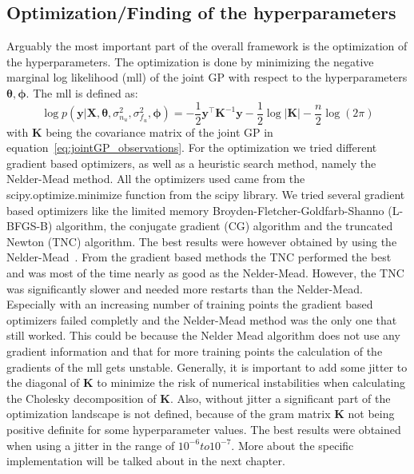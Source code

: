 \documentclass{article}
\begin{document}
\subsection{Optimization/Finding of the hyperparameters}
Arguably the most important part of the overall framework is the optimization of the hyperparameters. The optimization is done by minimizing the negative marginal log likelihood (mll) of the joint GP with respect to the hyperparameters $\bm{\theta, \phi}$. The mll is defined as:
\begin{equation}
    \label{eq:mll}
    \log p(\bm{y}|\bm{X},\bm{\theta},\sigma_{n_u}^2,\sigma_{f_u}^2,\bm{\phi}) =
    -\frac{1}{2}\bm{y}^\intercal \bm{K}^{-1}\bm{y} - \frac{1}{2}\log\left\lvert \bm{K}\right\rvert - \frac{n}{2}\log(2\pi)
\end{equation}
with $\bm{K}$ being the covariance matrix of the joint GP in equation~\ref{eq:jointGP_observations}. For the optimization we tried different gradient based optimizers, as well as a heuristic search method, namely the Nelder-Mead method. All the optimizers used came from the scipy.optimize.minimize function from the scipy library. We tried several gradient based optimizers like the limited memory Broyden-Fletcher-Goldfarb-Shanno (L-BFGS-B) algorithm, the conjugate gradient (CG) algorithm and the truncated Newton (TNC) algorithm. The best results were however obtained by using the Nelder-Mead~\cite{Singer:2009NelderMead}. From the gradient based methods the TNC performed the best and was most of the time nearly as good as the Nelder-Mead. However, the TNC was significantly slower and needed more restarts than the Nelder-Mead. Especially with an increasing number of training points the gradient based optimizers failed completly and the Nelder-Mead method was the only one that still worked. This could be because the Nelder Mead algorithm does not use any gradient information and that for more training points the calculation of the gradients of the mll gets unstable. Generally, it is important to add some jitter to the diagonal of $\bm{K}$ to minimize the risk of numerical instabilities when calculating the Cholesky decomposition of $\bm{K}$. Also, without jitter a significant part of the optimization landscape is not defined, because of the  gram matrix $\bm{K}$ not being positive definite for some hyperparameter values. The best results were obtained when using a jitter in the range of $10^{-6} to 10^{-7}$. More about the specific implementation will be talked about in the next chapter.\\
\\
\end{document}

